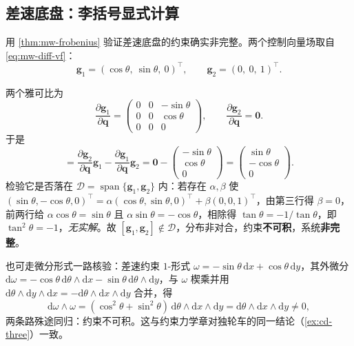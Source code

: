 \subsection{差速底盘：李括号显式计算}
\label{sec:mw-diff-bracket}

用 \cref{thm:mw-frobenius} 验证差速底盘的约束确实非完整。两个控制向量场取自 \cref{eq:mw-diff-vf}：
\begin{equation}
  \mathbf{g}_1=(\cos\theta,\ \sin\theta,\ 0)^\top,\qquad \mathbf{g}_2=(0,\ 0,\ 1)^\top.
  \label{eq:mw-diff-g}
\end{equation}

\begin{derivation}
两个雅可比为
\[
  \frac{\partial\mathbf{g}_1}{\partial\mathbf{q}}=\begin{pmatrix}0&0&-\sin\theta\\0&0&\cos\theta\\0&0&0\end{pmatrix},\qquad
  \frac{\partial\mathbf{g}_2}{\partial\mathbf{q}}=\mathbf{0}.
\]
于是
\begin{equation}
  [\mathbf{g}_1,\mathbf{g}_2]
  =\frac{\partial\mathbf{g}_2}{\partial\mathbf{q}}\mathbf{g}_1-\frac{\partial\mathbf{g}_1}{\partial\mathbf{q}}\mathbf{g}_2
  =\mathbf{0}-\begin{pmatrix}-\sin\theta\\\cos\theta\\0\end{pmatrix}
  =\begin{pmatrix}\sin\theta\\-\cos\theta\\0\end{pmatrix}.
  \label{eq:mw-diff-bracket}
\end{equation}
检验它是否落在 $\mathcal{D}=\operatorname{span}\{\mathbf{g}_1,\mathbf{g}_2\}$ 内：若存在 $\alpha,\beta$ 使 $(\sin\theta,-\cos\theta,0)^\top=\alpha(\cos\theta,\sin\theta,0)^\top+\beta(0,0,1)^\top$，由第三行得 $\beta=0$，前两行给 $\alpha\cos\theta=\sin\theta$ 且 $\alpha\sin\theta=-\cos\theta$，相除得 $\tan\theta=-1/\tan\theta$，即 $\tan^2\theta=-1$，\emph{无实解}。故 $[\mathbf{g}_1,\mathbf{g}_2]\notin\mathcal{D}$，分布非对合，约束\textbf{不可积}，系统\textbf{非完整}。
\end{derivation}

\noindent 也可走微分形式一路核验：差速约束 $1$-形式 $\omega=-\sin\theta\,\mathrm{d}x+\cos\theta\,\mathrm{d}y$，其外微分 $\mathrm{d}\omega=-\cos\theta\,\mathrm{d}\theta\wedge\mathrm{d}x-\sin\theta\,\mathrm{d}\theta\wedge\mathrm{d}y$，与 $\omega$ 楔乘并用 $\mathrm{d}\theta\wedge\mathrm{d}y\wedge\mathrm{d}x=-\mathrm{d}\theta\wedge\mathrm{d}x\wedge\mathrm{d}y$ 合并，得
\begin{equation}
  \mathrm{d}\omega\wedge\omega=(\cos^2\theta+\sin^2\theta)\,\mathrm{d}\theta\wedge\mathrm{d}x\wedge\mathrm{d}y=\mathrm{d}\theta\wedge\mathrm{d}x\wedge\mathrm{d}y\neq0,
  \label{eq:mw-diff-form}
\end{equation}
两条路殊途同归：约束不可积。这与约束力学章对独轮车的同一结论（\cref{ex:cd-three}）一致。

